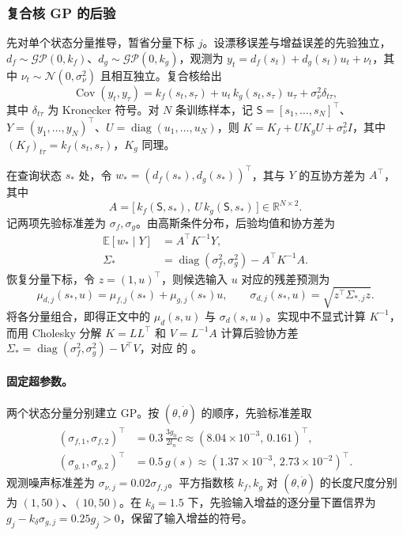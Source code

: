 \documentclass[UTF8,a4paper,zihao=-4,fontset=fandol]{ctexart}
\begin{document}
\subsubsection{复合核 GP 的后验}
先对单个状态分量推导，暂省分量下标 $j$。设漂移误差与增益误差的先验独立，$d_f\sim\mathcal{GP}(0,k_f)$、$d_g\sim\mathcal{GP}(0,k_g)$，观测为
$y_t=d_f(s_t)+d_g(s_t)u_t+\nu_t$，其中 $\nu_t\sim\mathcal N(0,\sigma_\nu^2)$ 且相互独立。复合核\cite{umlauft2020feedback}给出
\begin{equation}
\operatorname{Cov}(y_t,y_\tau)=k_f(s_t,s_\tau)+u_t\,k_g(s_t,s_\tau)\,u_\tau+\sigma_\nu^2\delta_{t\tau},
\end{equation}
其中 $\delta_{t\tau}$ 为 Kronecker 符号。对 $N$ 条训练样本，记 $\mathsf S=[s_1,\ldots,s_N]^\top$、$Y=(y_1,\ldots,y_N)^\top$、$U=\operatorname{diag}(u_1,\ldots,u_N)$，则
$K=K_f+UK_gU+\sigma_\nu^2I$，其中 $(K_f)_{t\tau}=k_f(s_t,s_\tau)$，$K_g$ 同理。

在查询状态 $s_*$ 处，令 $w_*=(d_f(s_*),d_g(s_*))^\top$，其与 $Y$ 的互协方差为 $A^\top$，其中
\begin{equation}
A=\bigl[\,k_f(\mathsf S,s_*),\ U\,k_g(\mathsf S,s_*)\,\bigr]\in\mathbb R^{N\times2}.
\end{equation}
记两项先验标准差为 $\sigma_f,\sigma_g$。由高斯条件分布\cite{rasmussen2006gp}，后验均值和协方差为
\begin{equation}
\begin{aligned}
\mathbb E[w_*\mid Y]&=A^\top K^{-1}Y,\\
\Sigma_*&=\operatorname{diag}(\sigma_f^2,\sigma_g^2)-A^\top K^{-1}A.
\end{aligned}
\end{equation}
恢复分量下标，令 $z=(1,u)^\top$，则候选输入 $u$ 对应的残差预测为
\[
\mu_{d,j}(s_*,u)=\mu_{f,j}(s_*)+\mu_{g,j}(s_*)u,\qquad
\sigma_{d,j}(s_*,u)=\sqrt{z^\top\Sigma_{*,j}z}.
\]
将各分量组合，即得正文中的 $\mu_d(s,u)$ 与 $\sigma_d(s,u)$。实现中不显式计算 $K^{-1}$，而用 Cholesky 分解 $K=LL^\top$ 和 $V=L^{-1}A$ 计算后验协方差 $\Sigma_*=\operatorname{diag}(\sigma_f^2,\sigma_g^2)-V^\top V$，对应  的 。

\paragraph{固定超参数。}
两个状态分量分别建立 GP。按 $(\theta,\dot\theta)$ 的顺序，先验标准差取
\[
\begin{aligned}
(\sigma_{f,1},\sigma_{f,2})^\top
 &=0.3\,\frac{3g_0}{2l_n}c
 \approx(8.04\times10^{-3},\,0.161)^\top,\\
(\sigma_{g,1},\sigma_{g,2})^\top
 &=0.5\,g(s)
 \approx(1.37\times10^{-3},\,2.73\times10^{-2})^\top.
\end{aligned}
\]
观测噪声标准差为 $\sigma_{\nu,j}=0.02\sigma_{f,j}$。平方指数核 $k_f,k_g$ 对 $(\theta,\dot\theta)$ 的长度尺度分别为 $(1,50)$、$(10,50)$。在 $k_\delta=1.5$ 下，先验输入增益的逐分量下置信界为 $g_j-k_\delta\sigma_{g,j}=0.25g_j>0$，保留了输入增益的符号。
\end{document}
